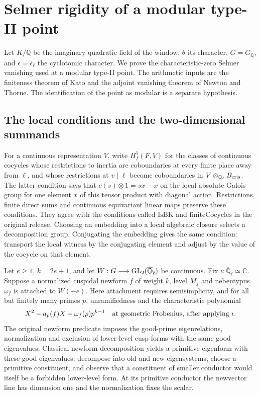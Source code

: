 \section{Selmer rigidity of a modular type-II point}
\label{sec:kato-rigidity}

Let \(K/\mathbb Q\) be the imaginary quadratic field of the window,
\(\theta\) its character, \(G=G_{\mathbb Q}\), and
\(\epsilon=\epsilon_\ell\) the cyclotomic character.
We prove the characteristic-zero Selmer vanishing used at a modular
type-II point. The arithmetic inputs are the finiteness theorem of
Kato and the adjoint vanishing theorem of Newton and Thorne. The
identification of the point as modular is a separate hypothesis.

\subsection{The local conditions and the two-dimensional summands}

For a continuous representation \(V\), write \(H^1_f(F,V)\) for
the classes of continuous cocycles whose restrictions to inertia
are coboundaries at every finite place away from \(\ell\), and whose
restrictions at \(v\mid\ell\) become coboundaries in
\(V\otimes_{\mathbb Q_\ell} B_{\rm cris}\). The latter condition says
that \(c(s)\otimes1=sx-x\) on the local absolute Galois group for
one element \(x\) of this tensor product with diagonal action.
Restrictions, finite direct sums and continuous equivariant linear
maps preserve these conditions. They agree with the conditions called
\(\mathrm{IsBK}\) and \(\mathrm{finiteCocycles}\) in the original
release. Choosing an embedding into a local algebraic closure selects a
decomposition group. Conjugating the embedding gives the same condition:
transport the local witness by the conjugating element and adjust by
the value of the cocycle on that element.

Let \(e\ge1\), \(k=2e+1\), and let
\(W:G\longrightarrow {\rm GL}_2(\overline{\mathbb Q}_\ell)\)
be continuous. Fix
\(\iota:\overline{\mathbb Q}_\ell\simeq\mathbb C\).
Suppose a normalized cuspidal newform \(f\) of weight \(k\), level
\(M_f\) and nebentypus \(\omega_f\) is attached to \(W(-e)\).
Here attachment requires semisimplicity, and for all but finitely
many primes \(p\), unramifiedness and the characteristic polynomial
\[
 X^2-a_p(f)X+\omega_f(p)p^{k-1}
 \quad\hbox{at geometric Frobenius, after applying }\iota.
\]
The original newform predicate imposes the good-prime eigenrelations,
normalization and exclusion of lower-level cusp forms with the same
good eigenvalues. Classical newform decomposition yields a primitive
eigenform with these good eigenvalues: decompose into old and new
eigensystems, choose a primitive constituent, and observe that a
constituent of smaller conductor would itself be a forbidden
lower-level form. At its primitive conductor the newvector line has
dimension one and the normalization fixes the scalar.

